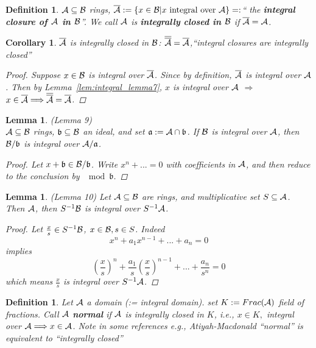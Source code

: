 \documentclass[11pt]{article}
\newtheorem{lemma}[thm]{Lemma}
\newtheorem{cor}[thm]{Corollary}
\newtheorem{dfn}[thm]{Definition}
\newcommand{\sca}{{\mathfrak a}}
\newcommand{\scb}{{\mathfrak b}}
\newcommand{\cala}{{\cal A}}
\newcommand{\calb}{{\cal B}}
\newcommand{\Lrta}{\Longrightarrow}
\begin{document}
\begin{dfn}
$\cala\subseteq \calb$ rings, $\overline{\cala}:=\{x\in\calb|x\text{ integral over }\cala\}=:$`` the \textbf{integral closure of $\cala$ in $\calb$}''. We call $\cala$ is \textbf{integrally closed in $\calb$} if $\overline{\cala}=\cala$.
\end{dfn}

\begin{cor}\label{cor_integral_cor8}
$\overline{\cala}$ is integrally closed in $\calb$: $\overline{\overline{\cala}}=\overline{\cala}$,``integral closures are integrally closed''
\begin{proof}
Suppose $x\in\calb$ is integral over $\overline{\cala}$. Since by definition, $\overline{\cala}$ is  integral over $\cala$. Then by Lemma~\ref{lem:integral_lemma7}, $x$ is integral over $\cala$ $\Lrta$ $x\in \overline{\cala}\Lrta\overline{\overline{\cala}}=\overline{\cala}$.
\end{proof}
\end{cor}

\begin{lemma}\label{lem:integral_lemma9}(Lemma 9)\\
$\cala\subseteq \calb$ rings, $\scb\subseteq\calb$ an ideal, and set $\sca:=\cala\cap\scb$. If $\calb$ is integral over $\cala$, then $\calb/\scb$ is integral over $\cala/\sca$.
\begin{proof}
Let $x+\scb\in \calb/\scb$. Write $x^n+...=0$ with coefficients in $\cala$, and then reduce to the conclusion by $\mod \scb$.
\end{proof}
\end{lemma}

\begin{lemma}\label{lem:integral_lemma10}(Lemma 10)
Let $\cala\subseteq \calb$ are rings, and multiplicative set $S\subseteq \cala$. Then $\cala$, then $S^{-1}\calb$ is integral over $S^{-1}\cala$.
\begin{proof}
Let $\frac{x}{s}\in S^{-1}\calb$, $x\in \calb, s\in S$.
Indeed
$$
x^n+a_1 x^{n-1}+...+a_n=0
$$
implies
$$
\left(\frac{x}{s}\right)^n+\frac{a_1}{s}\left(\frac{x}{s}\right)^{n-1}+...+\frac{a_n}{s^n}=0
$$
which means $\frac{x}{s}$ is integral over $S^{-1}\cala$.
\end{proof}
\end{lemma}

\begin{dfn}
Let $\cala$ a domain (:= integral domain).
set $K:=Frac(\cala)$ field of fractions. Call $\cala$ \textbf{normal} if $\cala$ is integrally closed in $K$, i.e., $x\in K, $ integral over $\cala\Lrta x\in\cala$.
Note in some references e.g., Atiyah-Macdonald ``normal'' is equivalent to ``integrally closed''
\end{dfn}
\end{document}
